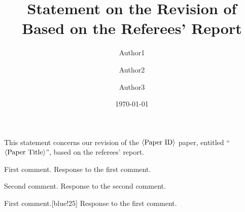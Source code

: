 \documentclass[10pt]{article}
\title{Statement on the Revision of \meta{Paper ID} \\
  Based on the Referees' Report}
\author{Author1 \and Author2 \and Author3}
\date{\today}
\newcommand\meta[1]{$\langle\hbox{#1}\rangle$}      %
\newcommand\PaperTitle[1]{``\textit{#1}''}          %
\begin{document}
This statement concerns our revision of the \meta{Paper ID} paper,
entitled \PaperTitle{\meta{Paper Title}}, based on the referees'
report.

\begin{response}{First comment.}
  Response to the first comment.
\end{response}
\begin{response}{Second comment.}
  Response to the second comment.
\end{response}

\begin{response}{First comment.}[blue!25]
  Response to the first comment.
\end{response}
\end{document}
